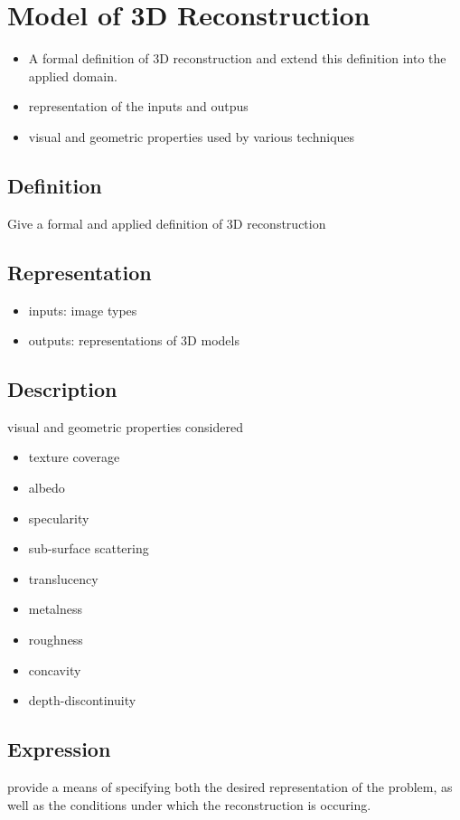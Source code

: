 
\chapter{Model of 3D Reconstruction}
\label{ch:3DRecon_Model}
\begin{itemize}
\item A formal definition of 3D reconstruction and extend this definition into the applied domain.
\item representation of the inputs and outpus
\item visual and geometric properties used by various techniques
\end{itemize}

\section{Definition}
Give a formal and applied definition of 3D reconstruction

\section{Representation}
\begin{itemize}
\item inputs: image types
\item outputs: representations of 3D models
\end{itemize}

\section{Description}
visual and geometric properties considered
\begin{itemize}
\item texture coverage
\item albedo
\item specularity
\item sub-surface scattering
\item translucency
\item metalness
\item roughness
\item concavity
\item depth-discontinuity
\end{itemize}

\section{Expression}
provide a means of specifying both the desired representation of the problem, as well as the conditions under which the reconstruction is occuring.
